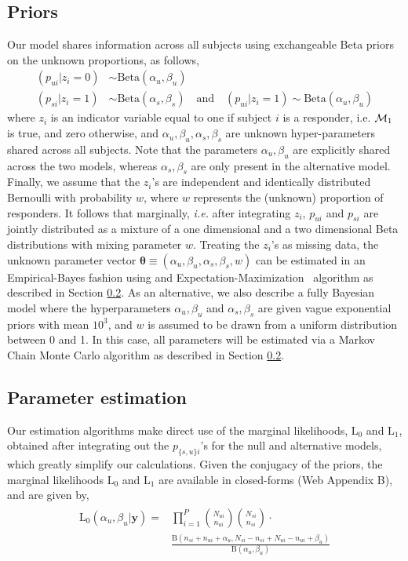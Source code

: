 \documentclass[useAMS,referee,usenatbib]{biom}
\begin{document}
\subsection{Priors}
\label{ss:priors}
Our model shares information across all subjects using exchangeable Beta priors on the unknown proportions, as follows, 
 \begin{align*}
(p_{ui} | z_{i}=0)  &\sim \mathrm{Beta}(\alpha_u, \beta_u)\\
(p_{si} | z_{i}=1)  &\sim \mathrm{Beta}(\alpha_s,\beta_s) \quad\mathrm{and}\quad (p_{ui}|z_{i}=1) \sim \mathrm{Beta}(\alpha_u, \beta_u)
 \end{align*}
where $z_i$ is an indicator variable equal to one if subject $i$ is a responder, i.e.  ${\cal M}_1$ is true, and zero otherwise, and $\alpha_u, \beta_u, \alpha_s,\beta_s$ are unknown hyper-parameters shared across all subjects. Note that the parameters $\alpha_u, \beta_u$ are explicitly shared across the two models, whereas $\alpha_s,\beta_s$ are only present in the alternative model. Finally, we assume that the $z_i$'s are independent and identically distributed Bernoulli with probability $w$, where $w$ represents the (unknown) proportion of responders. It follows that marginally, \textit{i.e.} after integrating $z_i$, $p_{ui}$ and $p_{si}$ are jointly distributed as a mixture of a one dimensional and a two dimensional Beta distributions with mixing parameter $w$. Treating the $z_i$'s as missing data, the unknown parameter vector $\boldsymbol\theta\equiv(\alpha_u, \beta_u, \alpha_s,\beta_s, w)$ can be estimated in an Empirical-Bayes fashion using and Expectation-Maximization~\citep{Dempster:1977ul} algorithm as described in Section \ref{s:estimation}. As an alternative, we also describe a fully Bayesian model where the hyperparameters $\alpha_u, \beta_u$ and $\alpha_s, \beta_s$ are given vague exponential priors with mean $10^3$, and $w$ is assumed to be drawn from a uniform distribution between 0 and 1. In this case, all parameters will be estimated via a Markov Chain Monte Carlo algorithm as described in Section \ref{s:estimation}. 

\subsection{Parameter estimation}
\label{s:estimation}
Our estimation algorithms make direct use of the marginal likelihoods, $\mathrm{L}_0$ and $\mathrm{L}_1$, obtained after integrating out the $p_{\{s,u\}i}$'s for the null and alternative models, which greatly simplify our calculations. Given the conjugacy of the priors, the marginal likelihoods $\mathrm{L}_0$ and $\mathrm{L}_1$ are available in closed-forms (Web Appendix B), and are given by,
 \begin{align*}
 \begin{split}
  	\mathrm{L}_0(\alpha_u,\beta_u|\mathbf{y})
	=&\prod_{i=1}^P\binom{N_{ui}}{n_{ui}}\binom{N_{si}}{n_{si}}\cdot\\ &\frac{\mathrm{B}(n_{si}+n_{ui}+\alpha_u,N_{si}-n_{si}+N_{ui}-n_{ui}+\beta_u)}{\mathrm{B}(\alpha_u,\beta_u)}
	\end{split}
 \end{align*} 
 
\end{document}
